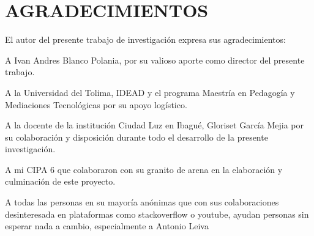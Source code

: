 \section*{AGRADECIMIENTOS}

\begin{singlespace}
El autor del presente trabajo de investigación expresa sus agradecimientos:

A Ivan Andres Blanco Polania, por su valioso aporte como director del presente trabajo.

A la Universidad del Tolima, IDEAD y el programa Maestría en Pedagogía y Mediaciones Tecnológicas por su apoyo 
logístico.

A la docente de la institución Ciudad Luz en Ibagué, Gloriset García Mejia por su colaboración y disposición 
durante todo el desarrollo de la presente investigación.

A mi CIPA 6 que colaboraron con su granito de arena en la elaboración y culminación de este proyecto.

A todas las personas en su mayoría anónimas que con sus colaboraciones desinteresada en plataformas como 
stackoverflow o youtube, ayudan personas sin esperar nada a cambio, especialmente a Antonio Leiva 
\end{singlespace}


